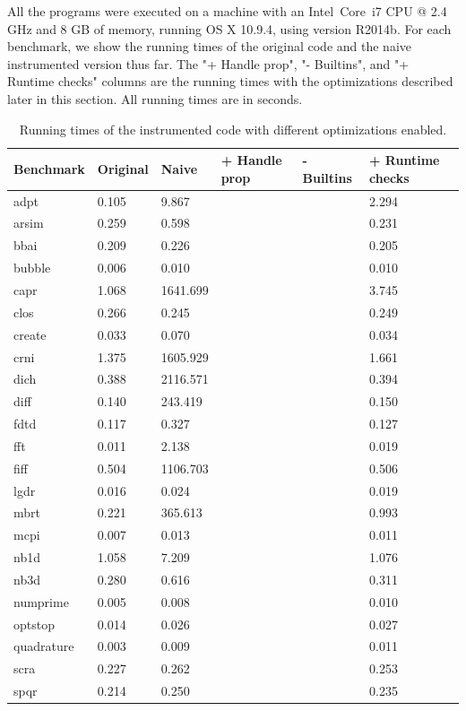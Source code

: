 All the programs were executed on a machine with an Intel\textregistered \,
Core\texttrademark \, i7 CPU @ 2.4 GHz and 8 GB of memory, running OS X 10.9.4,
using \matlab version R2014b.
For each benchmark, we show the running times of the original code and the naive
instrumented version thus far. The "+ Handle prop", "- Builtins", and "+ Runtime
checks" columns are the running times with the optimizations described later in
this section. All running times are in seconds.

\begin{table}
\begin{tabular}{| l | l | l | l | l | l |}
  \hline
  Benchmark & Original & Naive & + Handle prop & - Builtins & + Runtime checks \\ \hline
  adpt        & 0.105 & 9.867    & & & 2.294\\ \hline
  arsim       & 0.259 & 0.598    & & & 0.231\\ \hline
  bbai        & 0.209 & 0.226    & & & 0.205\\ \hline
  bubble      & 0.006 & 0.010    & & & 0.010\\ \hline
  capr        & 1.068 & 1641.699 & & & 3.745\\ \hline
  clos        & 0.266 & 0.245    & & & 0.249\\ \hline
  create      & 0.033 & 0.070    & & & 0.034\\ \hline
  crni        & 1.375 & 1605.929 & & & 1.661\\ \hline
  dich        & 0.388 & 2116.571 & & & 0.394\\ \hline
  diff        & 0.140 & 243.419  & & & 0.150\\ \hline
  fdtd        & 0.117 & 0.327    & & & 0.127\\ \hline
  fft         & 0.011 & 2.138    & & & 0.019\\ \hline
  fiff        & 0.504 & 1106.703 & & & 0.506\\ \hline
  lgdr        & 0.016 & 0.024    & & & 0.019\\ \hline
  mbrt        & 0.221 & 365.613  & & & 0.993\\ \hline
  mcpi        & 0.007 & 0.013    & & & 0.011\\ \hline
  nb1d        & 1.058 & 7.209    & & & 1.076\\ \hline
  nb3d        & 0.280 & 0.616    & & & 0.311\\ \hline
  numprime    & 0.005 & 0.008    & & & 0.010\\ \hline
  optstop     & 0.014 & 0.026    & & & 0.027\\ \hline
  quadrature  & 0.003 & 0.009    & & & 0.011\\ \hline
  scra        & 0.227 & 0.262    & & & 0.253\\ \hline
  spqr        & 0.214 & 0.250    & & & 0.235\\ \hline
\end{tabular}
\caption{Running times of the instrumented code with different optimizations
enabled.}
\label{tab:InstrumentationBenchmarks}
\end{table}

